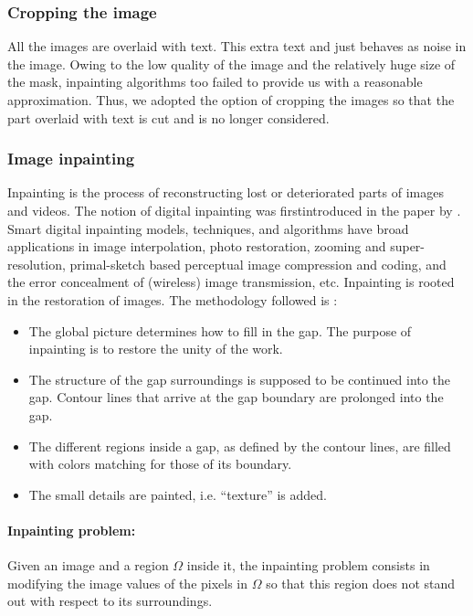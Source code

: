 \documentclass[letterpaper,12pt, onecolumn]{article}%
\begin{document}
\subsubsection*{Cropping the image}
All the images are overlaid with text. This extra text and just behaves as noise in the image. Owing to the low quality of the image and the relatively huge size of the mask, inpainting algorithms too failed to provide us with a reasonable approximation. Thus, we adopted the option of cropping the images so that the part overlaid with text is cut and is no longer considered. 

\subsubsection*{Image inpainting}
Inpainting is the process of reconstructing lost or deteriorated parts of images and videos. The notion of digital inpainting was firstintroduced in the paper by \cite{bertalmio2000image}. Smart digital inpainting models, techniques, and algorithms have broad applications in image interpolation, photo restoration, zooming and super-resolution, primal-sketch based perceptual image compression and coding, and the error concealment of (wireless) image transmission, etc. 
Inpainting is rooted in the restoration of images. The methodology followed is : 
\begin{itemize}
\item The global picture determines how to fill in the gap. The purpose of inpainting is to restore the unity of the work.
\item	The structure of the gap surroundings is supposed to be continued into the gap. Contour lines that arrive at the gap boundary are prolonged into the gap.
\item The different regions inside a gap, as defined by the contour lines, are filled with colors matching for those of its boundary.
\item The small details are painted, i.e. \enquote{texture} is added.
\end{itemize}


\paragraph{Inpainting problem:} 
Given an image and a region $\Omega$ inside it, the inpainting problem consists in modifying the image values of the pixels in $\Omega$ so that this region does not stand out with respect to its surroundings.
\end{document}
